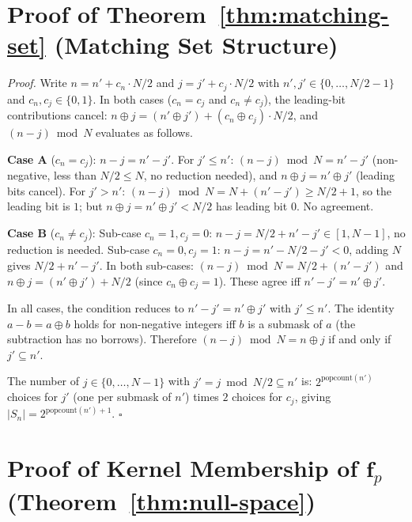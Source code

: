 \documentclass[10pt,a4paper]{amsart}
\begin{document}



\newpage

\setcounter{theorem}{0}
\appendix

\section{Proof of Theorem~\ref{thm:matching-set} (Matching Set Structure)}
\label{app:matching-set-proof}

\noindent\textit{Proof.} Write $n = n' + c_n \cdot N/2$ and $j = j' + c_j \cdot N/2$ with $n', j' \in \{0,\ldots,N/2-1\}$ and $c_n, c_j \in \{0,1\}$. In both cases ($c_n = c_j$ and $c_n \neq c_j$), the leading-bit contributions cancel: $n \oplus j = (n' \oplus j') + (c_n \oplus c_j)\cdot N/2$, and $(n-j)\bmod N$ evaluates as follows.

\medskip
\noindent\textbf{Case A} ($c_n = c_j$): $n - j = n' - j'$. For $j' \leq n'$: $(n-j)\bmod N = n'-j'$ (non-negative, less than $N/2 \leq N$, no reduction needed), and $n \oplus j = n' \oplus j'$ (leading bits cancel). For $j' > n'$: $(n-j)\bmod N = N + (n'-j') \geq N/2+1$, so the leading bit is $1$; but $n \oplus j = n' \oplus j' < N/2$ has leading bit $0$. No agreement.

\medskip
\noindent\textbf{Case B} ($c_n \neq c_j$): Sub-case $c_n=1, c_j=0$: $n-j = N/2 + n' - j' \in [1,N-1]$, no reduction is needed. Sub-case $c_n=0, c_j=1$: $n-j = n' - N/2 - j' < 0$, adding $N$ gives $N/2 + n' - j'$. In both sub-cases: $(n-j)\bmod N = N/2 + (n'-j')$ and $n \oplus j = (n' \oplus j') + N/2$ (since $c_n \oplus c_j = 1$). These agree iff $n'-j' = n' \oplus j'$.

\medskip
In all cases, the condition reduces to $n' - j' = n' \oplus j'$ with $j' \leq n'$. The identity $a - b = a \oplus b$ holds for non-negative integers iff $b$ is a submask of $a$ (the subtraction has no borrows). Therefore $(n-j)\bmod N = n \oplus j$ if and only if $j' \subseteq n'$.

The number of $j \in \{0,\ldots,N-1\}$ with $j' = j \bmod N/2 \subseteq n'$ is: $2^{\mathrm{popcount}(n')}$ choices for $j'$ (one per submask of $n'$) times $2$ choices for $c_j$, giving $|S_n| = 2^{\mathrm{popcount}(n')+1}$. $\square$

\section{Proof of Kernel Membership of $\mathbf{f}_p$ (Theorem~\ref{thm:null-space})}
\label{app:fp-kernel-proof}
\end{document}
